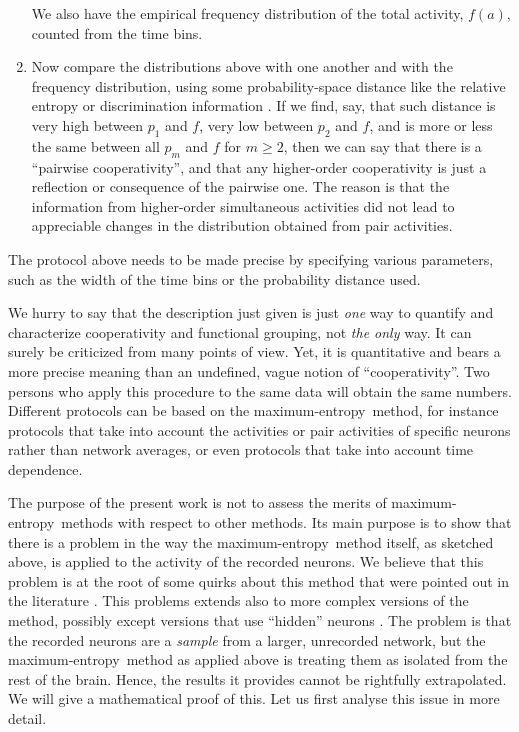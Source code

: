\documentclass[\ifafour a4paper,12pt,\else a5paper,10pt,\fi%
onecolumn,oneside,article,%
british%
]{memoir}
\theoremstyle{remark}
\theoremstyle{innote}
\newcommand*{\citep}{\parencites}
\renewcommand*{\ge}{\geqslant}%
\renewcommand*{\|}{\nonscript\,\vert\nonscript\;\mathopen{}}
\newcommand*{\yav}{a}
\newcommand*{\ya}{\yav}%
\newcommand*{\me}{maximum-entropy}
\begin{document}
\begin{enumerate}
  We also have the empirical frequency distribution of the total activity,
  $f(\ya)$, counted from the time bins.

\item Now compare the distributions above with one another and with the
  frequency distribution, using some probability-space distance like the
  relative entropy or discrimination information
  \citep{kullback1987,jaynes1963,hobson1969,hobsonetal1973}. If we find,
  say, that such distance is very high between $p_1$ and $f$, very low
  between $p_2$ and $f$, and is more or less the same between all $p_m$ and
  $f$ for $m \ge 2$, then we can say that there is a \enquote{pairwise
    cooperativity}, and that any higher-order cooperativity is just a
  reflection or consequence of the pairwise one. The reason is that the
  information from higher-order simultaneous activities did not lead to
  appreciable changes in the distribution obtained from pair activities.
\end{enumerate}
The protocol above needs to be made precise by specifying various
parameters, such as the width of the time bins or the probability
distance used.

We hurry to say that the description just given is just \emph{one} way to
quantify and characterize cooperativity and functional grouping, not
\emph{the only} way. It can surely be criticized from many points of view.
Yet, it is quantitative and bears a more precise meaning than an undefined,
vague notion of \enquote{cooperativity}. Two persons who apply this
procedure to the same data will obtain the same numbers. Different
protocols can be based on the \me\ method, for instance protocols that take
into account the activities or pair activities of specific neurons rather
than network averages, or even protocols that take into account time
dependence.
\textcolor{white}{If you find this you can claim a postcard from me.}

The purpose of the present work is not to assess the merits of \me\ methods
with respect to other methods. Its main purpose is to show that there is a
problem in the way the \me\ method itself, as sketched above, is applied to
the activity of the recorded neurons. We believe that this problem is at
the root of some quirks about this method that were pointed out in the
literature \citep{roudietal2009b}. This problems extends also to more
complex versions of the method, possibly except versions that use
\enquote{hidden} neurons
\citep{smolensky1986,kulkarnietal2007,huang2015,dunnetal2017}. The problem is
that the recorded neurons are a \emph{sample} from a larger, unrecorded
network, but the \me\ method as applied above is treating them as
isolated from the rest of the brain. Hence, the results it provides cannot
be rightfully extrapolated. We will give a mathematical proof of this. Let
us first analyse this issue in more detail.
\end{document}
